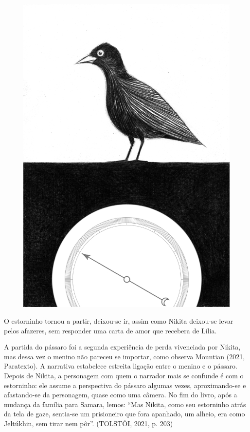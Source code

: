\documentclass{article}
\begin{document}
\begin{enumerate}
\begin{figure}[ht!]
\includegraphics[width=\textwidth]{./images/PNLD0049-05.png}
\end{figure}

O estorninho tornou a partir, deixou-se ir, assim como Nikita deixou-se
levar pelos afazeres, sem responder uma carta de amor que recebera de
Lília.

A partida do pássaro foi a segunda experiência de perda vivenciada por
Nikita, mas dessa vez o menino não pareceu se importar, como observa
Mountian (2021, Paratexto). A narrativa estabelece estreita ligação
entre o menino e o pássaro. Depois de Nikita, a personagem com quem o
narrador mais se confunde é com o estorninho: ele assume a perspectiva
do pássaro algumas vezes, aproximando-se e afastando-se da personagem,
quase como uma câmera. No fim do livro, após a mudança da família para
Samara, lemos: ``Mas Nikita, como seu estorninho atrás da tela de gaze,
sentia-se um prisioneiro que fora apanhado, um alheio, era como
Jeltúkhin, sem tirar nem pôr''. (TOLSTÓI, 2021, p. 203)


\end{enumerate}
\end{document}
